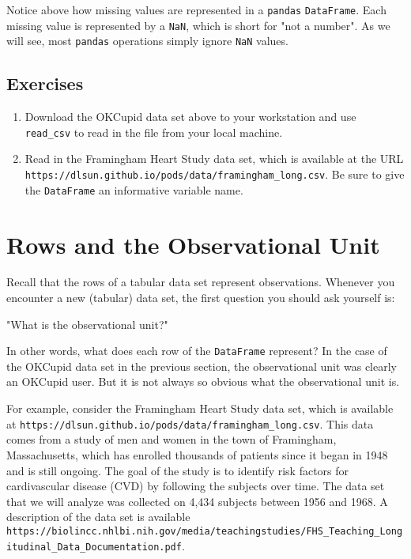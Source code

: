 Notice above how missing values are represented in a \verb|pandas| \verb|DataFrame|. Each missing value is represented by a \verb|NaN|, which is short for "not a number". As we will see, most \verb|pandas| operations simply ignore \verb|NaN| values.



\subsection{Exercises}\label{1.1.2}


\begin{enumerate}
\item 
Download the OKCupid data set above to your workstation and use \verb|read_csv| to read in the file from your local machine.

\item 
Read in the Framingham Heart Study data set,
which is available at the URL \verb|https://dlsun.github.io/pods/data/framingham_long.csv|. Be sure to give the \verb|DataFrame| an
informative variable name.

\end{enumerate}






\section{Rows and the Observational Unit}\label{1.2}

Recall that the rows of a tabular data set represent observations. Whenever you encounter a new (tabular) data
set, the first question you should ask yourself is:
\begin{displayquote}
"What is the observational unit?"
\end{displayquote}

In other words, what does each row of the
\verb|DataFrame| represent? In the case of
the OKCupid data set in the previous section, the observational unit was clearly an OKCupid user. But it is not always so obvious what the observational unit is.

For example, consider the Framingham Heart Study data set, which is available at \verb|https://dlsun.github.io/pods/data/framingham_long.csv|.
This data comes from a study of men and women in
the town of Framingham, Massachusetts, which has enrolled
thousands of patients since it began in 1948 and is still ongoing. The goal of the study is to identify risk factors for cardivascular disease (CVD) by following the subjects over time. The data set that we will analyze was collected on 4,434 subjects between 1956 and 1968. A description of the data set is available \verb|https://biolincc.nhlbi.nih.gov/media/teachingstudies/FHS_Teaching_Longitudinal_Data_Documentation.pdf|.

